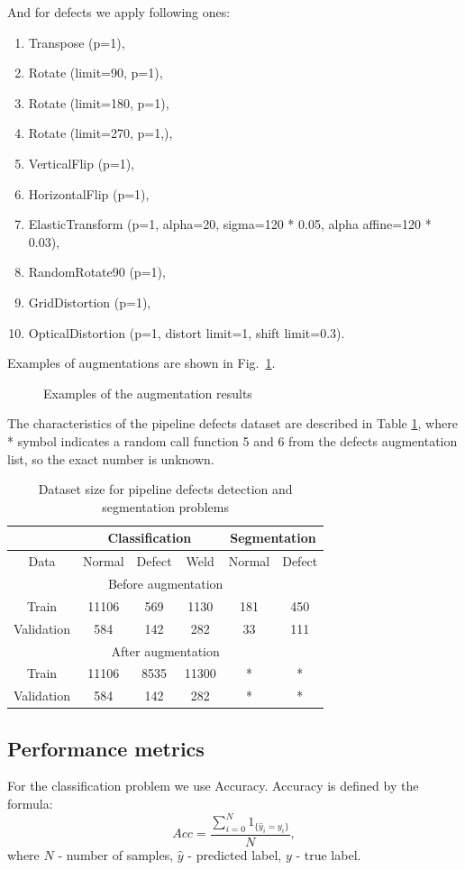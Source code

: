 And for defects we apply following ones:
\begin{enumerate}
	\item Transpose (p=1), 
	\item Rotate (limit=90, p=1), 
	\item Rotate (limit=180, p=1), 
	\item Rotate (limit=270, p=1,), 
	\item VerticalFlip (p=1), 
	\item HorizontalFlip (p=1), 
	\item ElasticTransform (p=1, alpha=20, sigma=120 * 0.05, alpha affine=120 * 0.03),
	\item RandomRotate90 (p=1),
	\item GridDistortion (p=1),
	\item OpticalDistortion (p=1, distort limit=1, shift limit=0.3).
\end{enumerate}
Examples of augmentations are shown in Fig.~\ref{ris:aug_example}.
\begin{figure}[ht]
	\caption{Examples of the augmentation results}
	\label{ris:aug_example}
\end{figure}


The characteristics of the pipeline defects dataset are described in Table \ref{tab:alg1}, where * symbol indicates a random call function 5 and 6 from the defects augmentation list, so the exact number is unknown.
\begin{table}[!htb]
	\caption{\label{tab:alg1}Dataset size for pipeline defects detection and segmentation problems}
	\begin{center}
		\small
		\begin{tabular}{| c | c  c  c | c  c |}
			\multicolumn{1}{c}{} & \multicolumn{3}{c}{Classification} & \multicolumn{2}{c}{Segmentation} \\
			\hline
			Data & Normal & Defect & Weld & Normal & Defect \\
			\hline
			\multicolumn{6}{|c|}{Before augmentation}  \\
			\hline
			Train  & 11106 & 569 & 1130 & 181 & 450 \\
			Validation & 584 & 142 & 282 & 33 & 111 \\
			\hline
			\multicolumn{6}{|c|}{After augmentation}  \\
			\hline
			Train  & 11106 & 8535 & 11300 & * & * \\
			Validation & 584 & 142 & 282 & * & * \\
			\hline
		\end{tabular}
	\end{center}
\end{table}

\subsection{Performance metrics}
For the classification problem we use Accuracy.
Accuracy is defined by the formula:
$$Acc = \frac{\sum_{i=0}^{N} 1_{\{\hat{y}_i=y_i\}}}{N},$$
where $N$ - number of samples, $\hat{y}$ - predicted label, $y$ - true label.
